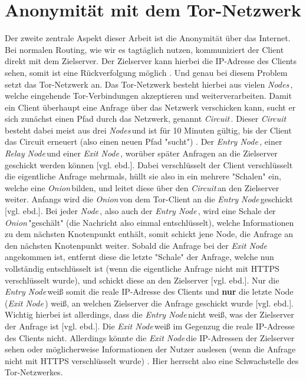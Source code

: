 \documentclass[a4paper,ngerman, headheight=28pt,12pt]{scrartcl}
\newcommand{\vcite}[1]{\cite[vgl.][]{#1}}
\newcommand{\vebd}{[vgl. ebd.]}
\newcommand{\entryn}{\textit{Entry Node\,}}
\newcommand{\relayn}{\textit{Relay Node\,}}
\newcommand{\exitn}{\textit{Exit Node\,}}
\newcommand{\nodes}{\textit{Nodes\,}}
\newcommand{\node}{\textit{Node\,}}
\newcommand{\onion}{\textit{Onion\,}}
\newcommand{\circuit}{\textit{Circuit\,}}
\begin{document}
\section{Anonymität mit dem Tor-Netzwerk}
Der zweite zentrale Aspekt dieser Arbeit ist die Anonymität über das Internet.
Bei normalen Routing, wie wir es tagtäglich nutzen, kommuniziert der Client direkt mit dem Zielserver. Der Zielserver kann hierbei die IP-Adresse des Clients sehen, somit ist eine Rückverfolgung möglich \vcite{LocPolice,TCP_IP}. Und genau bei diesem Problem setzt das Tor-Netzwerk an. Das Tor-Netzwerk besteht hierbei aus vielen \nodes, welche eingehende Tor-Verbindungen akzeptieren und weiterverarbeiten. Damit ein Client überhaupt eine Anfrage über das Netzwerk verschicken kann, sucht er sich zunächst einen Pfad durch das Netzwerk, genannt \circuit \vcite{TorCircuits}. Dieser \circuit besteht dabei meist aus drei \nodes und ist für 10 Minuten gültig, bis der Client das Circuit erneuert (also einen neuen Pfad "sucht") \vcite{FAQCircuitLifetime}. Der \entryn, einer \relayn und einer \exitn, worüber später Anfragen an die Zielserver geschickt werden können \vebd.
Dabei verschlüsselt der Client verschlüsselt die eigentliche Anfrage mehrmals, hüllt sie also in ein mehrere "Schalen" ein, welche eine \onion bilden, und leitet diese über den \circuit an den Zielserver weiter\vcite{TorDesign}. Anfangs wird die \onion von dem Tor-Client an die \entryn geschickt \vebd. Bei jeder \node, also auch der \entryn, wird eine Schale der \onion "geschält" (die Nachricht also einmal entschlüsselt), welche Informationen zu dem nächsten Knotenpunkt enthält, somit schickt jene Node, die Anfrage an den nächsten Knotenpunkt weiter\vcite{TorStructure2}.
Sobald die Anfrage bei der \exitn angekommen ist, entfernt diese die letzte "Schale" der Anfrage, welche nun vollständig entschlüsselt ist (wenn die eigentliche Anfrage nicht mit HTTPS verschlüsselt wurde), und schickt diese an den Zielserver \vebd. Nur die \entryn weiß somit die reale IP-Adresse des Clients und \textbf{nur} die letzte Node (\exitn) weiß, an welchen Zielserver die Anfrage geschickt wurde \vebd. Wichtig hierbei ist allerdings, dass die \entryn nicht weiß, was der Zielserver der Anfrage ist \vebd. Die \exitn weiß im Gegenzug die reale IP-Adresse des Clients nicht. Allerdings könnte die \exitn die IP-Adressen der Zielserver sehen oder möglicherweise Informationen der Nutzer auslesen (wenn die Anfrage nicht mit HTTPS verschlüsselt wurde) \vcite{TorExitNodeVulnerability}. Hier herrscht also eine Schwachstelle des Tor-Netzwerkes.
\end{document}
